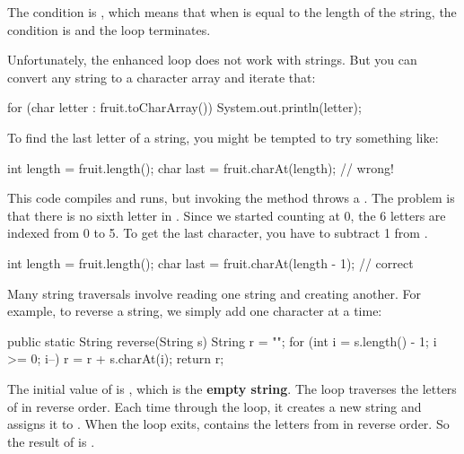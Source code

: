 
The condition is , which means that when  is equal to the length of the string, the condition is  and the loop terminates.


Unfortunately, the enhanced  loop does not work with strings.
But you can convert any string to a character array and iterate that:

\begin{code}
for (char letter : fruit.toCharArray()) {
    System.out.println(letter);
}
\end{code}

To find the last letter of a string, you might be tempted to try something like:

\begin{code}
int length = fruit.length();
char last = fruit.charAt(length);      // wrong!
\end{code}


This code compiles and runs, but invoking the  method throws a .
The problem is that there is no sixth letter in .
Since we started counting at 0, the 6 letters are indexed from 0 to 5.
To get the last character, you have to subtract 1 from .

\begin{code}
int length = fruit.length();
char last = fruit.charAt(length - 1);  // correct
\end{code}

Many string traversals involve reading one string and creating another.
For example, to reverse a string, we simply add one character at a time:

\begin{code}
public static String reverse(String s) {
    String r = "";
    for (int i = s.length() - 1; i >= 0; i--) {
        r = r + s.charAt(i);
    }
    return r;
}
\end{code}


The initial value of  is , which is the {\bf empty string}.
The loop traverses the letters of  in reverse order.
Each time through the loop, it creates a new string and assigns it to .
When the loop exits,  contains the letters from  in reverse order.
So the result of  is .


